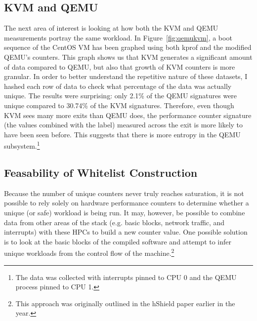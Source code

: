 \documentclass[notitlepage]{article}
\begin{document}
\subsection{KVM and QEMU}
The next area of interest is looking at how both the KVM and QEMU measurements
portray the same workload. In Figure~\ref{fig:qemukvm}, a boot sequence of the
CentOS VM has been graphed using both kprof and the modified QEMU's counters.
This graph shows us that KVM generates a significant amount of data compared to
QEMU, but also that growth of KVM counters is more granular. In order to better
understand the repetitive nature of these datasets, I hashed each row of data to
check what percentage of the data was actually unique. The results were
surprising: only 2.1\% of the QEMU signatures were unique compared to 30.74\% of
the KVM signatures. Therefore, even though KVM sees many more exits than QEMU
does, the performance counter signature (the values combined with the label)
measured across the exit is more likely to have been seen before. This suggests
that there is more entropy in the QEMU subsystem.\footnote{The data was
collected with interrupts pinned to CPU 0 and the QEMU process pinned to CPU 1.}

\subsection{Feasability of Whitelist Construction} Because the number of unique
counters never truly reaches saturation, it is not possible to rely solely on
hardware performance counters to determine whether a unique (or safe) workload
is being run. It may, however, be possible to combine data from other areas of
the stack (e.g. basic blocks, network traffic, and interrupts) with these HPCs
to build a new counter value. One possible solution is to look at the basic
blocks of the compiled software and attempt to infer unique workloads from the
control flow of the machine.\footnote{This approach was originally outlined in
the hShield paper earlier in the year.}
\end{document}

